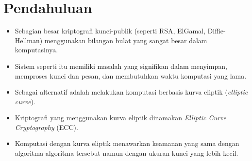 \documentclass{article}
\begin{document}

\section*{Pendahuluan}

\begin{itemize}
    \item Sebagian besar kriptografi kunci-publik (seperti RSA, ElGamal, Diffie-Hellman) menggunakan bilangan bulat yang sangat besar dalam komputasinya.
    \item Sistem seperti itu memiliki masalah yang signifikan dalam menyimpan, memproses kunci dan pesan, dan membutuhkan waktu komputasi yang lama.
    \item Sebagai alternatif adalah melakukan komputasi berbasis kurva eliptik (\textit{elliptic curve}).
    \item Kriptografi yang menggunakan kurva eliptik dinamakan \textit{Elliptic Curve Cryptography} (ECC).
    \item Komputasi dengan kurva eliptik menawarkan keamanan yang sama dengan algoritma-algoritma tersebut namun dengan ukuran kunci yang lebih kecil.
\end{itemize}

\vfill
{}
\end{document}
